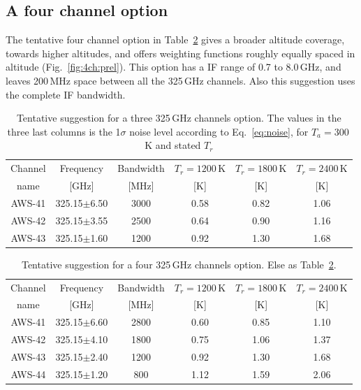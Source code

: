 \documentclass[12pt]{article}
\begin{document}
\subsection{A four channel option}
%
The tentative four channel option in Table~\ref{tab:chs:prel4} gives a broader
altitude coverage, towards higher altitudes, and offers weighting functions
roughly equally spaced in altitude (Fig.~\ref {fig:4ch:prel}). This option has
a IF range of 0.7 to 8.0\,GHz, and leaves 200\,MHz space between all the
325\,GHz channels. Also this suggestion uses the complete IF bandwidth.

\begin{table}[!p]
  \centering  
  \begin{tabular}[c]{c|c|c|ccc}
    Channel & Frequency   & Bandwidth & $T_r=1200$\,K
    & $T_r=1800$\,K & $T_r=2400$\,K\\
    name    & [GHz] &  [MHz] & [K]  & [K] & [K]\\
    \hline
    AWS-41  & 325.15$\pm$6.50 & 3000 & 0.58 & 0.82 & 1.06 \\
    AWS-42  & 325.15$\pm$3.55 & 2500 & 0.64 & 0.90 & 1.16 \\
    AWS-43  & 325.15$\pm$1.60 & 1200 & 0.92 & 1.30 & 1.68 \\
    \hline
  \end{tabular}
  \caption{Tentative suggestion for a three 325\,GHz channels option. The
    values in the three last columns is the 1$\sigma$ noise level according to
    Eq.~\ref{eq:noise}, for $T_a=300$\,K and stated $T_r$ }
  \label{tab:chs:prel3}
\end{table}

\begin{table}[!p]
  \centering  
  \begin{tabular}[c]{c|c|c|ccc}
    Channel & Frequency   & Bandwidth & $T_r=1200$\,K
    & $T_r=1800$\,K & $T_r=2400$\,K\\
    name    & [GHz] &  [MHz] & [K]  & [K] & [K]\\
    \hline
    AWS-41  & 325.15$\pm$6.60 & 2800 & 0.60 & 0.85 & 1.10 \\
    AWS-42  & 325.15$\pm$4.10 & 1800 & 0.75 & 1.06 & 1.37 \\
    AWS-43  & 325.15$\pm$2.40 & 1200 & 0.92 & 1.30 & 1.68 \\
    AWS-44  & 325.15$\pm$1.20 & \phantom{0}800 & 1.12 & 1.59 & 2.06\\
    \hline
  \end{tabular}
  \caption{Tentative suggestion for a four 325\,GHz channels option. Else as
    Table~\ref{tab:chs:prel4}.}
  \label{tab:chs:prel4}
\end{table}
\end{document}
